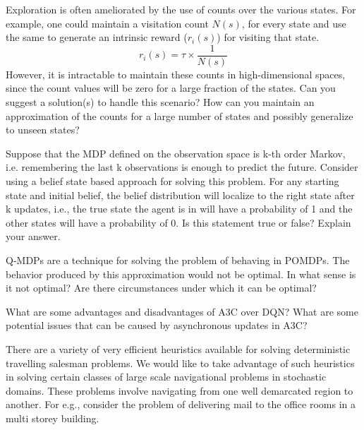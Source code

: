 \documentclass[solution,addpoints,12pt]{exam}
\begin{document}
\begin{questions}
\question[4] Exploration is often ameliorated by the use of counts over the various states. For example, one could maintain a visitation count $N(s)$, for every state and use the same to generate an intrinsic reward ($r_i(s)$) for visiting that state.
\[ r_i(s) = \tau \times \frac{1}{N(s)} \]
However, it is intractable to maintain these counts in high-dimensional spaces, since the count values will be zero for a large fraction of the states. Can you suggest a solution(s) to handle this scenario? How can you maintain an approximation of the counts for a large number of states and possibly generalize to unseen states?

\begin{solution}

\end{solution}

\question[5] Suppose that the MDP defined on the observation space is k-th order Markov, i.e. remembering the last k observations is enough to predict the future. 
Consider using a belief state based approach for solving this problem. For any starting state and initial belief, the belief distribution will localize to the right state after k updates, i.e., the true state the agent is in will have a probability of 1 and the other states will have a probability of 0. Is this statement true or false? Explain your answer. 

\begin{solution}

\end{solution}




\question[3]
Q-MDPs are a technique for solving the problem of behaving in POMDPs. The behavior produced by this approximation would not be optimal. In what sense is it not optimal?  Are there circumstances under which it can be optimal?

\begin{solution}

\end{solution}

\question[3] What are some advantages and disadvantages of A3C over DQN? What are some potential issues that can be caused by asynchronous updates in A3C?

\begin{solution}

\end{solution}

\question[6] There are a variety of very efficient heuristics available for solving deterministic travelling salesman problems. We would like to take advantage of such heuristics in solving
certain classes of large scale navigational problems in stochastic domains. These problems involve navigating from one well demarcated region to another. For e.g., consider
the problem of delivering mail to the office rooms in a multi storey building.


\end{questions}
\end{document}
